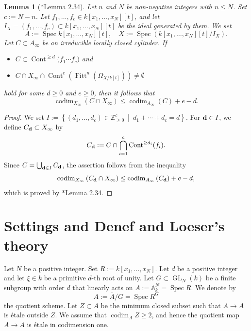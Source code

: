 \documentclass[a4paper,11pt]{amsart}
\newtheorem{lem}[thm]{Lemma}
\theoremstyle{definition}
\theoremstyle{remark}
\begin{document}
\begin{lem}[{\cite{NS22}*{Lemma 2.34}}]\label{lem:EM8.4}
Let $n$ and $N$ be non-negative integers with $n \le N$. 
Set $c := N - n$. 
Let $f_1, \ldots , f_c \in k[x_1,\ldots,x_N][t]$, and 
let $I_X = ( f_1, \ldots , f_c ) \subset k[x_1,\ldots,x_N][t]$ be the ideal generated by them. 
We set 
\[
A := \operatorname{Spec} k[x_1,\ldots,x_N][t], \quad 
X := \operatorname{Spec} \left( k[x_1,\ldots,x_N][t] / I_X \right). 
\]
Let $C \subset A_{\infty}$ be an irreducible locally closed cylinder. 
If 
\begin{itemize}
\item $C \subset \operatorname{Cont}^{\ge d} \bigl( f_1 \cdots f_c \bigr)$ and 
\item $C \cap X_{\infty} \cap \operatorname{Cont}^{e}\left( \operatorname{Fitt}^n \left( \Omega _{X/k[t]} \right) \right) \not = \emptyset$
\end{itemize}
hold for some $d \ge 0$ and $e \ge 0$, 
then it follows that
\[
\operatorname{codim}_{X_{\infty}} (C \cap X_{\infty}) \le \operatorname{codim}_{A_{\infty}} (C) + e - d.
\]
\end{lem}
\begin{proof}
We set $I :=  \left\{ 
(d_1, \ldots , d_c) \in \mathbb{Z}_{\ge 0} ^c \ \middle | \ d_1 + \cdots + d_c = d  
\right \}$. 
For ${\bf d} \in I$, we define $C _{\bf d} \subset X_{\infty}$ by 
\[
C _{\bf d} := C \cap \bigcap_{i=1}^c \operatorname{Cont}^{\ge d_i} (f_i). 
\]
Since $C = \bigcup _{{\bf d} \in I} C_{\bf d}$, the assertion follows from the inequality
\[
\operatorname{codim}_{X_{\infty}} \left( C _{\bf d} \cap X_{\infty} \right) 
\le 
\operatorname{codim}_{A_{\infty}} \left( C_{\bf d} \right) + e - d,
\]
which is proved by \cite{NS22}*{Lemma 2.34}. 
\end{proof}


\section{Settings and Denef and Loeser’s theory}\label{section:setting}
Let $N$ be a positive integer. Set $R := k[x_1, \ldots , x_N]$. 
Let $d$ be a positive integer and let $\xi \in k$ be a primitive $d$-th root of unity. 
Let $G \subset \operatorname{GL}_N(k)$ be a finite subgroup with order $d$ that linearly acts on 
$\overline{A} := \mathbb{A}^N _k = \operatorname{Spec} R$. 
We denote by 
\[
A := \overline{A}/G = \operatorname{Spec} R^G
\]
the quotient scheme. 
Let $Z \subset A$ be the minimum closed subset such that $\overline{A} \to A$ is \'{e}tale outside $Z$.
We assume that $\operatorname{codim}_A Z \ge 2$, and hence the quotient map $\overline{A} \to A$ is \'{e}tale in codimension one. 
\end{document}
